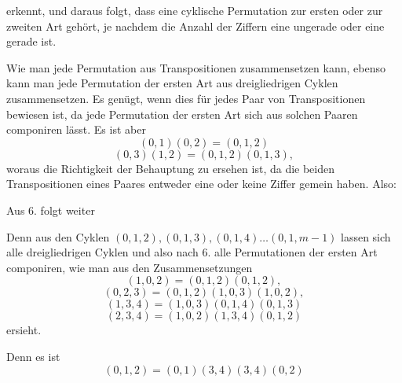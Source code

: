 erkennt, und daraus folgt, dass eine cyklische Permutation zur ersten oder zur zweiten Art gehört, je nachdem die Anzahl der Ziffern eine ungerade oder eine gerade ist.

Wie man jede Permutation aus Transpositionen zusammensetzen kann, ebenso kann man jede Permutation der ersten Art aus dreigliedrigen Cyklen zusammensetzen. Es genügt, wenn dies für jedes Paar von Transpositionen bewiesen ist, da jede Permutation der ersten Art sich aus solchen Paaren componiren lässt. Es ist aber
\[
(0, 1)(0, 2) = (0, 1, 2)
\]
\[
(0, 3)(1, 2) = (0, 1, 2)(0, 1, 3),
\]
woraus die Richtigkeit der Behauptung zu ersehen ist, da die beiden Transpositionen eines Paares entweder eine oder keine Ziffer gemein haben. Also:


Aus 6. folgt weiter


Denn aus den Cyklen $(0, 1, 2), (0, 1, 3), (0, 1, 4) \dots (0, 1, m - 1)$ lassen sich alle dreigliedrigen Cyklen und also nach 6. alle Permutationen der ersten Art componiren, wie man aus den Zusammensetzungen
\[
(1, 0, 2) = (0, 1, 2)(0, 1, 2),
\]
\[
(0, 2, 3) = (0, 1, 2)(1, 0, 3)(1, 0, 2),
\]
\[
(1, 3, 4) = (1, 0, 3)(0, 1, 4)(0, 1, 3)
\]
\[
(2, 3, 4) = (1, 0, 2)(1, 3, 4)(0, 1, 2)
\]
ersieht.


Denn es ist
\[
(0, 1, 2) = (0, 1)(3, 4)(3, 4)(0, 2)
\]
